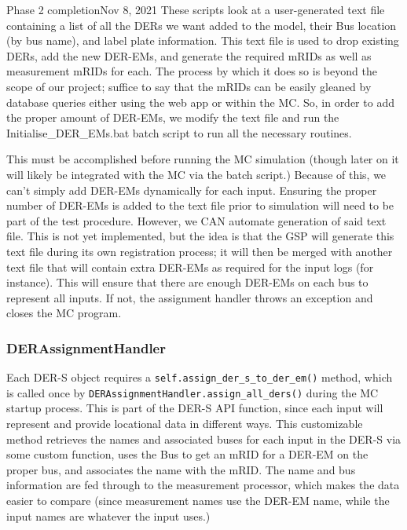 \begin{entry}{Phase 2 completion}{Nov 8, 2021}
    These scripts look at a user-generated text file containing a list of all the DERs we want added to the model, 
    their Bus location (by bus name), and label plate information. This text file is used to drop existing DERs, add
    the new DER-EMs, and generate the required mRIDs as well as measurement mRIDs for each. The process by which it 
    does so is beyond the scope of our project; suffice to say that the mRIDs can be easily gleaned by database queries
    either using the web app or within the MC. So, in order to add the proper amount of DER-EMs, we modify the text file
    and run the Initialise_DER_EMs.bat batch script to run all the necessary routines.
    
    This must be accomplished before running the MC simulation (though later on it will likely be integrated with the MC
    via the batch script.) Because of this, we can't simply add DER-EMs dynamically for each input. Ensuring the proper
    number of DER-EMs is added to the text file prior to simulation will need to be part of the test procedure. 
    However, we CAN automate generation of said text file. This is not yet implemented, but the idea is that the GSP
    will generate this text file during its own registration process; it will then be merged with another text file that
    will contain extra DER-EMs as required for the input logs (for instance). This will ensure that there are enough
    DER-EMs on each bus to represent all inputs. If not, the assignment handler throws an exception and closes the
    MC program.
    
    \subsubsection*{DERAssignmentHandler}
    Each DER-S object requires a \verb|self.assign_der_s_to_der_em()| method, which is called
    once by \verb|DERAssignmentHandler.assign_all_ders()| during the MC startup process. This is
    part of the DER-S API function, since each input will represent and provide locational data in different ways. This
    customizable method retrieves the names and associated buses for each input in the DER-S via some custom function,
    uses the Bus to get an mRID for a DER-EM on the proper bus, and associates the name with the mRID. The name and bus
    information are fed through to the measurement processor, which makes the data easier to compare (since measurement
    names use the DER-EM name, while the input names are whatever the input uses.)


\end{entry}
